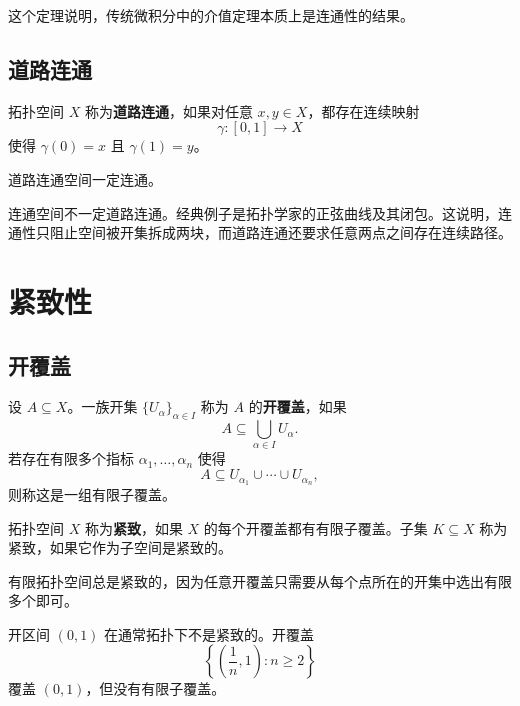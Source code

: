 这个定理说明，传统微积分中的介值定理本质上是连通性的结果。

\subsection{道路连通}

\begin{definition}[道路连通]
拓扑空间 $X$ 称为\textbf{道路连通}，如果对任意 $x,y\in X$，都存在连续映射
\[
    \gamma:[0,1]\to X
\]
使得 $\gamma(0)=x$ 且 $\gamma(1)=y$。
\end{definition}

\begin{proposition}
道路连通空间一定连通。
\end{proposition}

\begin{remark}
连通空间不一定道路连通。经典例子是拓扑学家的正弦曲线及其闭包。这说明，连通性只阻止空间被开集拆成两块，而道路连通还要求任意两点之间存在连续路径。
\end{remark}

\section{紧致性}

\subsection{开覆盖}

\begin{definition}[开覆盖]
设 $A\subseteq X$。一族开集 $\{U_\alpha\}_{\alpha\in I}$ 称为 $A$ 的\textbf{开覆盖}，如果
\[
    A\subseteq\bigcup_{\alpha\in I}U_\alpha.
\]
若存在有限多个指标 $\alpha_1,\dots,\alpha_n$ 使得
\[
    A\subseteq U_{\alpha_1}\cup\cdots\cup U_{\alpha_n},
\]
则称这是一组有限子覆盖。
\end{definition}

\begin{definition}[紧致性]
拓扑空间 $X$ 称为\textbf{紧致}，如果 $X$ 的每个开覆盖都有有限子覆盖。子集 $K\subseteq X$ 称为紧致，如果它作为子空间是紧致的。
\end{definition}

\begin{example}
有限拓扑空间总是紧致的，因为任意开覆盖只需要从每个点所在的开集中选出有限多个即可。
\end{example}

\begin{example}
开区间 $(0,1)$ 在通常拓扑下不是紧致的。开覆盖
\[
    \left\{\left(\frac1n,1\right):n\ge2\right\}
\]
覆盖 $(0,1)$，但没有有限子覆盖。
\end{example}

